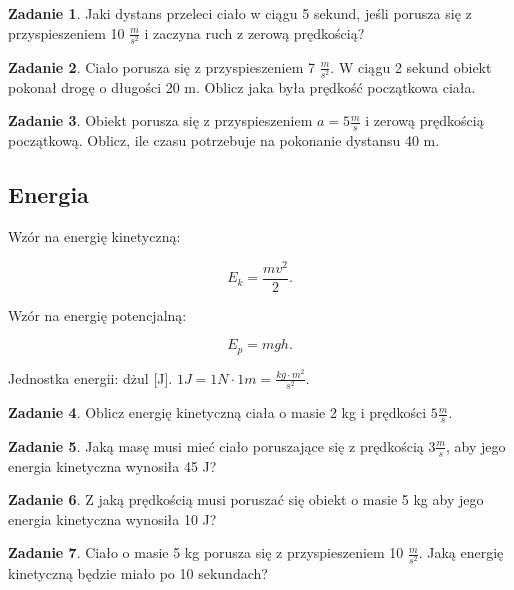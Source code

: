 \documentclass[11pt]{article}
\theoremstyle{definition}
\newtheorem{zad}{Zadanie}
\numberwithin{zad}{section}
\begin{document}
\begin{zad}
Jaki dystans przeleci ciało w ciągu 5 sekund, jeśli porusza się z przyspieszeniem 10 $\frac{m}{s^2}$ i zaczyna ruch z zerową prędkością?
\end{zad}

\begin{zad}
Ciało porusza się z przyspieszeniem 7 $\frac m{s^2}$. W ciągu 2 sekund obiekt pokonał drogę o długości 20 m. Oblicz jaka była prędkość początkowa ciała.
\end{zad}

\begin{zad}
Obiekt porusza się z przyspieszeniem $a=5 \frac ms$ i zerową prędkością początkową. Oblicz, ile czasu potrzebuje na pokonanie dystansu 40 m.
\end{zad}

\subsection{Energia}

Wzór na energię kinetyczną:

\begin{equation}
E_k = \frac{mv^2}2.
\end{equation}

Wzór na energię potencjalną:

\begin{equation}
E_p = mgh.
\end{equation}

Jednostka energii: dżul [J]. $1 J = 1 N \cdot 1 m = \frac{kg \cdot m^2}{s^2}.$

\begin{zad}
Oblicz energię kinetyczną ciała o masie 2 kg i prędkości $5 \frac ms$.
\end{zad}

\begin{zad}
Jaką masę musi mieć ciało poruszające się z prędkością $3 \frac ms$, aby jego energia kinetyczna wynosiła 45 J?
\end{zad}

\begin{zad}
Z jaką prędkością musi poruszać się obiekt o masie 5 kg aby jego energia kinetyczna wynosiła 10 J?
\end{zad}

\begin{zad}
Ciało o masie 5 kg porusza się z przyspieszeniem 10 $\frac m{s^2}$. Jaką energię kinetyczną będzie miało po 10 sekundach?
\end{zad}
\end{document}
